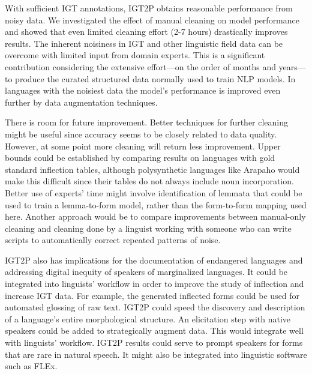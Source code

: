 With sufficient IGT annotations, IGT2P obtains reasonable performance from noisy data. 
We investigated the effect of manual cleaning on model performance and showed that even limited cleaning effort (2-7 hours) drastically improves results. The inherent noisiness in IGT and other linguistic field data can be overcome with limited input from domain experts. This is a significant contribution considering the extensive effort---on the order of months and years---to produce the curated structured data normally used to train NLP models. 
In languages with the noisiest data the model's performance is improved even further by data augmentation techniques.

There is room for future improvement. Better techniques for further cleaning might be useful since accuracy seems to be closely related to data quality. However, at some point more cleaning will return less improvement. Upper bounds could be established by comparing results on languages with gold standard inflection tables, although polysynthetic languages like Arapaho would make this difficult since their tables do not always include noun incorporation. Better use of experts' time might involve identification of lemmata that could be used to train a lemma-to-form model, rather than the form-to-form mapping used here. Another approach would be to compare improvements between manual-only cleaning and cleaning done by a linguist working with someone who can write scripts to automatically correct repeated patterns of noise. 

IGT2P also has implications for the documentation of endangered languages and addressing digital inequity of speakers of marginalized languages. It could be integrated into linguists’ workflow in order to improve the study of inflection and increase IGT data. For example, the generated inflected forms could be used for automated glossing of raw text. IGT2P could speed the discovery and description of a language's entire morphological structure. An elicitation step with native speakers could be added to strategically augment data. This would integrate well with linguists’ workflow. IGT2P results could serve to prompt speakers for forms that are rare in natural speech. It might also be integrated into linguistic software such as FLEx.